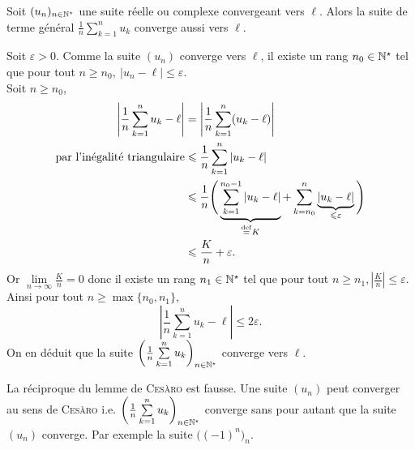 \begin{lemme}
    Soit $(u_n)_{n \in \mathbb{N}^\star}$ une suite réelle ou complexe convergeant vers $\ell$.
    Alors la suite de terme général $\frac{1}{n} \sum\limits_{k=1}^{n} u_k$ converge aussi vers $\ell$.
\end{lemme}

\begin{preuve}
    Soit $\varepsilon > 0$. Comme la suite $(u_n)$ converge vers $\ell$, il existe un rang $n_0 \in \mathbb{N}^\star$ tel que pour tout $n \geqslant n_0,\ |u_n - \ell| \leqslant \varepsilon$. \\
    Soit $n \geqslant n_0$,
    \begin{align*}
        \left| \frac{1}{n} \sum_{k=1}^n u_k - \ell \right| &= \left| \frac{1}{n} \sum_{k=1}^n (u_k - \ell) \right| \\
        \text{par l'inégalité triangulaire} &\leqslant \frac{1}{n} \sum_{k=1}^n |u_k - \ell| \\
        &\leqslant \frac{1}{n} \Bigg( \underbrace{\sum_{k=1}^{n_0-1} |u_k - \ell|}_{\overset{\mathrm{\tiny def}}{=} K} + \sum_{k=n_0}^n \underbrace{|u_k - \ell|}_{\leqslant \varepsilon} \Bigg) \\
        &\leqslant \frac{K}{n} + \varepsilon.
    \end{align*}
    Or $\lim\limits_{n \to \infty} \frac{K}{n} = 0$ donc il existe un rang $n_1 \in \mathbb{N}^\star$ tel que pour tout $n \geqslant n_1, \left| \frac{K}{n} \right| \leqslant \varepsilon$. \\
    Ainsi pour tout $n \geqslant \max \{ n_0, n_1 \}$, 
    $$\left| \frac{1}{n} \sum_{k=1}^n u_k - \ell \right| \leqslant 2 \varepsilon.$$
    On en déduit que la suite $\bigg( \frac{1}{n} \sum\limits_{k=1}^{n} u_k \bigg)_{n \in \mathbb{N}^\star}$ converge vers $\ell$.
\end{preuve}

\begin{remarque}
    La réciproque du lemme de \textsc{Cesàro} est fausse. Une suite $(u_n)$ peut converger au sens de \textsc{Cesàro} i.e. $\bigg( \frac{1}{n} \sum\limits_{k=1}^{n} u_k \bigg)_{n \in \mathbb{N}^\star}$ converge sans pour autant que la suite $(u_n)$ converge. Par exemple la suite $\big((-1)^n\big)_n$.
\end{remarque}
